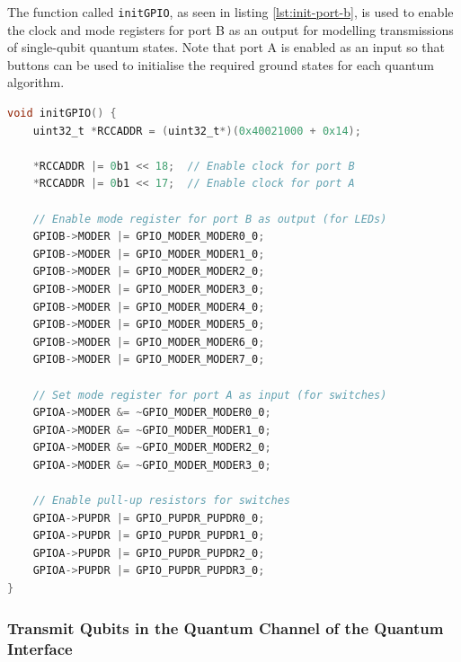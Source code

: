 The function called \texttt{initGPIO}, as seen in listing \ref{lst:init-port-b}, is used to enable the clock and mode registers for port B as an output for modelling transmissions of single-qubit quantum states. Note that port A is enabled as an input so that buttons can be used to initialise the required ground states for each quantum algorithm. 
\begin{lstlisting}[language=C, caption={Showing the \texttt{initGPIO} function for enabling ports B as a outputs and ports A as inputs.}, label={lst:init-port-b}]
void initGPIO() {
	uint32_t *RCCADDR = (uint32_t*)(0x40021000 + 0x14);
	
	*RCCADDR |= 0b1 << 18;  // Enable clock for port B
	*RCCADDR |= 0b1 << 17;  // Enable clock for port A
	
	// Enable mode register for port B as output (for LEDs)
	GPIOB->MODER |= GPIO_MODER_MODER0_0;
	GPIOB->MODER |= GPIO_MODER_MODER1_0;
	GPIOB->MODER |= GPIO_MODER_MODER2_0;
	GPIOB->MODER |= GPIO_MODER_MODER3_0;
	GPIOB->MODER |= GPIO_MODER_MODER4_0;
	GPIOB->MODER |= GPIO_MODER_MODER5_0;
	GPIOB->MODER |= GPIO_MODER_MODER6_0;
	GPIOB->MODER |= GPIO_MODER_MODER7_0;
	
	// Set mode register for port A as input (for switches)
	GPIOA->MODER &= ~GPIO_MODER_MODER0_0;
	GPIOA->MODER &= ~GPIO_MODER_MODER1_0;
	GPIOA->MODER &= ~GPIO_MODER_MODER2_0;
	GPIOA->MODER &= ~GPIO_MODER_MODER3_0;
	
	// Enable pull-up resistors for switches
	GPIOA->PUPDR |= GPIO_PUPDR_PUPDR0_0;
	GPIOA->PUPDR |= GPIO_PUPDR_PUPDR1_0;
	GPIOA->PUPDR |= GPIO_PUPDR_PUPDR2_0;
	GPIOA->PUPDR |= GPIO_PUPDR_PUPDR3_0;
}
\end{lstlisting}

\subsubsection{Transmit Qubits in the Quantum Channel of the Quantum Interface}

